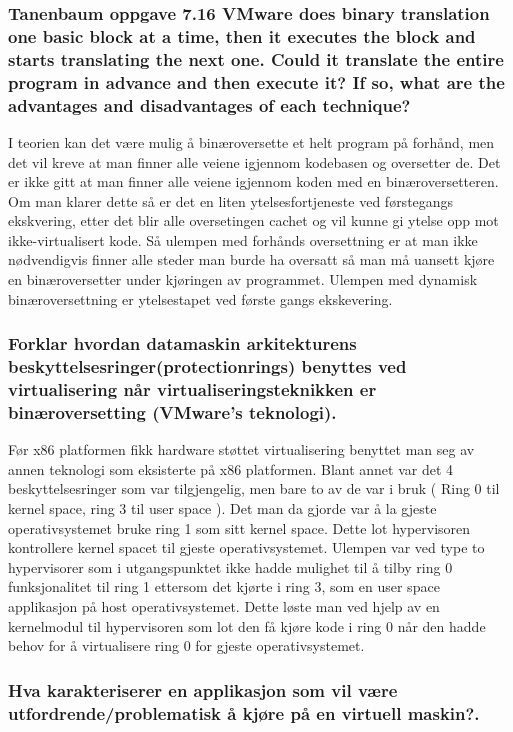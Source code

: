 \documentclass[9pt]{article}
\begin{document}
\subsubsection{Tanenbaum oppgave 7.16 VMware does binary translation one basic block at a time, then it executes the block and starts translating the next one. Could it translate the entire program in advance and then execute it? If so, what are the advantages and disadvantages of each technique?}

I teorien kan det være mulig å binæroversette et helt program på forhånd, men det vil kreve at man finner alle veiene igjennom kodebasen og oversetter de. Det er ikke gitt at man finner alle veiene igjennom koden med en binæroversetteren. Om man klarer dette så er det en liten ytelsesfortjeneste ved førstegangs ekskvering, etter det blir alle oversetingen cachet og vil kunne gi ytelse opp mot ikke-virtualisert kode. Så ulempen med forhånds oversettning er at man ikke nødvendigvis finner alle steder man burde ha oversatt så man må uansett kjøre en binæroversetter under kjøringen av programmet. Ulempen med dynamisk binæroversettning er ytelsestapet ved første gangs ekskevering.

\subsubsection{Forklar hvordan datamaskin arkitekturens beskyttelsesringer(protectionrings) benyttes ved virtualisering når virtualiseringsteknikken er binæroversetting (VMware’s teknologi).}

Før x86 platformen fikk hardware støttet virtualisering benyttet man seg av annen teknologi som eksisterte på x86 platformen. Blant annet var det 4 beskyttelsesringer som var tilgjengelig, men bare to av de var i bruk ( Ring 0 til kernel space, ring 3 til user space ). Det man da gjorde var å la gjeste operativsystemet bruke ring 1 som sitt kernel space. Dette lot hypervisoren kontrollere kernel spacet til gjeste operativsystemet. Ulempen var ved type to hypervisorer som i utgangspunktet ikke hadde mulighet til å tilby ring 0 funksjonalitet til ring 1 ettersom det kjørte i ring 3, som en user space applikasjon på host operativsystemet. Dette løste man ved hjelp av en kernelmodul til hypervisoren som lot den få kjøre kode i ring 0 når den hadde behov for å virtualisere ring 0 for gjeste operativsystemet.

\subsubsection{Hva karakteriserer en applikasjon som vil være utfordrende/problematisk å kjøre på en virtuell maskin?.}
\end{document}
